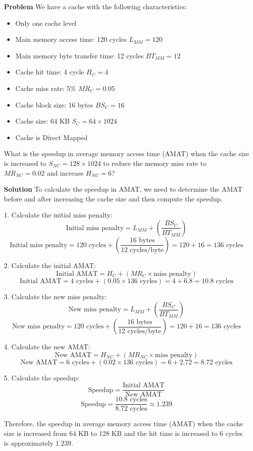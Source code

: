 \textbf{Problem}
We have a cache with the following characteristics:
\begin{itemize}
    \item Only one cache level
    \item Main memory access time: 120 cycles $L_{MM}=120$
    \item Main memory byte transfer time: 12 cycles $BT_{MM}=12$
    \item Cache hit time: 4 cycle $H_{C}=4$
    \item Cache miss rate: 5\% $MR_{C}=0.05$
    \item Cache block size: 16 bytes $BS_{C}=16$
    \item Cache size: 64 KB $S_{C}=64 \times 1024$
    \item Cache is Direct Mapped
\end{itemize}
What is the speedup in average memory access time (AMAT) when the cache size is increased to $S_{NC}=128 \times 1024$ to reduce the memory miss rate to $MR_{NC}=0.02$ and increase $H_{NC}=6$?

\textbf{Solution}
To calculate the speedup in AMAT, we need to determine the AMAT before and after increasing the cache size and then compute the speedup.

1. Calculate the initial miss penalty:
\[
\text{Initial miss penalty} = L_{MM} + \left(\frac{BS_{C}}{BT_{MM}}\right)
\]
\[
\text{Initial miss penalty} = 120 \text{ cycles} + \left(\frac{16 \text{ bytes}}{12 \text{ cycles/byte}}\right) = 120 + 16 = 136 \text{ cycles}
\]

2. Calculate the initial AMAT:
\[
\text{Initial AMAT} = H_{C} + (MR_{C} \times \text{miss penalty})
\]
\[
\text{Initial AMAT} = 4 \text{ cycles} + (0.05 \times 136 \text{ cycles}) = 4 + 6.8 = 10.8 \text{ cycles}
\]

3. Calculate the new miss penalty:
\[
\text{New miss penalty} = L_{MM} + \left(\frac{BS_{C}}{BT_{MM}}\right)
\]
\[
\text{New miss penalty} = 120 \text{ cycles} + \left(\frac{16 \text{ bytes}}{12 \text{ cycles/byte}}\right) = 120 + 16 = 136 \text{ cycles}
\]

4. Calculate the new AMAT:
\[
\text{New AMAT} = H_{NC} + (MR_{NC} \times \text{miss penalty})
\]
\[
\text{New AMAT} = 6 \text{ cycles} + (0.02 \times 136 \text{ cycles}) = 6 + 2.72 = 8.72 \text{ cycles}
\]

5. Calculate the speedup:
\[
\text{Speedup} = \frac{\text{Initial AMAT}}{\text{New AMAT}}
\]
\[
\text{Speedup} = \frac{10.8 \text{ cycles}}{8.72 \text{ cycles}} \approx 1.239
\]

Therefore, the speedup in average memory access time (AMAT) when the cache size is increased from 64 KB to 128 KB and the hit time is increased to 6 cycles is approximately 1.239.

